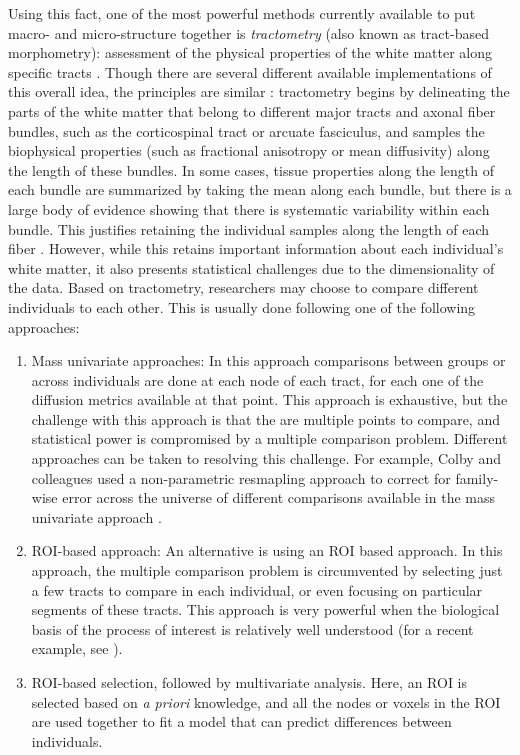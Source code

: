 \begin{itemize}
Using this fact, one of the most powerful methods currently available to put
macro- and micro-structure together is \emph{tractometry} (also known as
tract-based morphometry): assessment of the physical properties of the white
matter along specific tracts \cite{Bells2011-cf}. Though there are several
different available implementations of this overall idea, the principles are
similar \cite{yeatman2012, Yendiki2011-ay, Wassermann2016-iv, ODonnell2009-uu}:
tractometry begins by delineating the parts of the white matter that belong to
different major tracts and axonal fiber bundles, such as the corticospinal tract
or arcuate fasciculus, and samples the biophysical properties (such as
fractional anisotropy or mean diffusivity) along the length of these bundles. In
some cases, tissue properties along the length of each bundle are summarized by
taking the mean along each bundle, but there is a large body of evidence showing
that there is systematic variability within each bundle. This justifies
retaining the individual samples along the length of each fiber
\cite{yeatman2012, colby2012, ODonnell2009-uu}. However, while this retains
important information about each individual's white matter, it also presents
statistical challenges due to the dimensionality of the data. Based on
tractometry, researchers may choose to compare different individuals to each
other. This is usually done following one of the following approaches:

\begin{enumerate}
\item Mass univariate approaches: In this approach comparisons between groups or
across individuals are done at each node of each tract, for each one of the
diffusion metrics available at that point. This approach is exhaustive, but the
challenge with this approach is that the are multiple points to compare, and
statistical power is compromised by a multiple comparison problem. Different
approaches can be taken to resolving this challenge. For example, Colby and
colleagues \cite{colby2012} used a non-parametric resmapling approach to correct
for family-wise error across the universe of different comparisons available in
the mass univariate approach \cite{Nichols2002-zu, Nichols2003-yy}.
\item ROI-based approach: An alternative is using an ROI based approach. In this
approach, the multiple comparison problem is circumvented by selecting just a
few tracts to compare in each individual, or even focusing on particular
segments of these tracts. This approach is very powerful when the biological
basis of the process of interest is relatively well understood (for a recent
example, see \cite{huber2018rapid}).
\item ROI-based selection, followed by multivariate analysis. Here, an ROI is
selected based on \emph{a priori} knowledge, and all the nodes or voxels in the
ROI are used together to fit a model that can predict differences between
individuals.
\end{enumerate}


\end{itemize}
